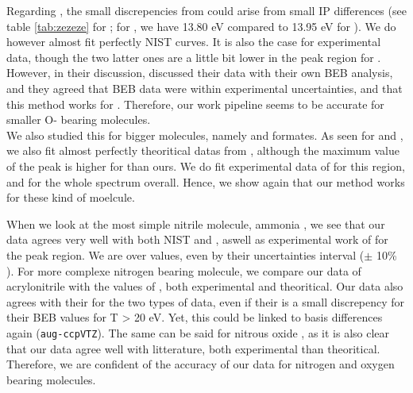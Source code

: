 \documentclass[article,preview]{planetary}
\begin{document}
Regarding , the small discrepencies from \textcite{gachesAstrochemistryLowenergyElectron2024} could arise from small IP differences (see table \ref{tab:zezeze} for ; for , we have 13.80 eV compared to 13.95 eV for \cite[CCSD(T)]{gachesAstrochemistryLowenergyElectron2024}). We do however almost fit perfectly NIST curves. It is also the case for \textcite{khanAbsolutePartialTotal2024,itikawaCrossSectionsElectron2015,zhouTotalElectronIonization2019,rappTotalCrossSections1965,hudsonAbsoluteElectronImpact2003} experimental data, though the two latter ones are a little bit lower in the peak region for . However, in their discussion, \textcite{hudsonAbsoluteElectronImpact2003} discussed their data with their own BEB analysis, and they agreed that BEB data were within experimental uncertainties, and that this method works for .  Therefore, our work pipeline seems to be accurate for smaller O- bearing molecules. \\
We also studied this for bigger molecules, namely  and  formates.  As seen for  and , we also fit almost perfectly theoritical datas from \textcite{kaurElectronInducedIonization2015}, although the maximum value of the peak is higher for \textcite{kaurElectronInducedIonization2015} than ours. We do fit experimental data of \textcite{hudsonAbsoluteElectronImpact2006} for this region, and for the whole spectrum overall. Hence, we show again that our method works for these kind of moelcule.

When we look at the most simple nitrile molecule, ammonia , we see that our data agrees very well with both NIST and \textcite{gachesAstrochemistryLowenergyElectron2024}, aswell as experimental work of \textcite{raoCrossSectionsDirect1991} for the peak region. We are over \textcite{syageSpectroscopyDynamicsJetcooled1992} values, even by their uncertainties interval ($\pm$ 10\% ). For more complexe nitrogen bearing molecule, we compare our data of acrylonitrile  with the values of \textcite{zhouTotalElectronIonization2019}, both experimental and theoritical. Our data also agrees with their for the two types of data, even if their is a small discrepency for their BEB values for T > 20 eV. Yet, this could be linked to basis differences again (\verb|aug-ccpVTZ|). The same can be said for nitrous oxide , as it is also clear that our data agree well with litterature, both experimental than theoritical. Therefore, we are confident of the accuracy of our data for nitrogen and oxygen bearing molecules.
\end{document}
